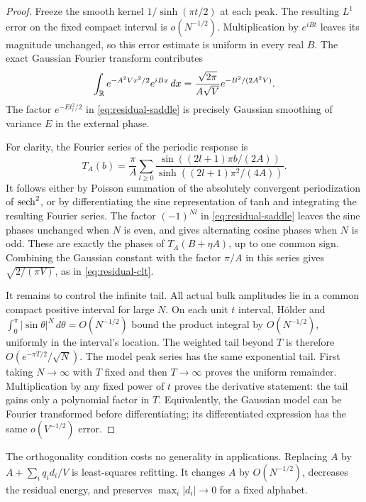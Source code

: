 \begin{proof}
Freeze the smooth kernel $1/\sinh(\pi t/2)$ at each peak. The resulting
$L^1$ error on the fixed compact interval is $o(N^{-1/2})$.
Multiplication by $e^{iBt}$ leaves its magnitude unchanged, so this
error estimate is uniform in every real $B$. The exact Gaussian Fourier
transform contributes
\[
 \int_{\mathbb R}e^{-A^2Vx^2/2}e^{iBx}\,dx
 =\frac{\sqrt{2\pi}}{A\sqrt V}e^{-B^2/(2A^2V)}.
\]
The factor $e^{-Et_l^2/2}$ in \eqref{eq:residual-saddle} is precisely
Gaussian smoothing of variance $E$ in the external phase.

For clarity, the Fourier series of the periodic response is
\[
 T_A(b)=\frac\pi A\sum_{l\ge0}
 \frac{\sin((2l+1)\pi b/(2A))}
      {\sinh((2l+1)\pi^2/(4A))}.
\]
It follows either by Poisson summation of the absolutely convergent
periodization of $\operatorname{sech}^2$, or by differentiating the sine representation
of tanh and integrating the resulting Fourier series. The factor
$(-1)^{Nl}$ in \eqref{eq:residual-saddle} leaves the sine phases unchanged
when $N$ is even, and gives alternating cosine phases when $N$ is odd.
These are exactly the phases of $T_A(B+\eta A)$, up to one common sign.
Combining the Gaussian constant with the factor $\pi/A$ in this series
gives $\sqrt{2/(\pi V)}$, as in \eqref{eq:residual-clt}.

It remains to control the infinite tail. All actual bulk amplitudes lie
in a common compact positive interval for large $N$. On each unit
$t$ interval, H\"older and
$\int_0^\pi|\sin\theta|^N\,d\theta=O(N^{-1/2})$ bound the product
integral by $O(N^{-1/2})$, uniformly in the interval's location.
The weighted tail beyond $T$ is therefore
$O(e^{-\pi T/2}/\sqrt N)$. The model peak series has the same
exponential tail. First taking $N\to\infty$ with $T$ fixed and then
$T\to\infty$ proves the uniform remainder. Multiplication by any fixed
power of $t$ proves the derivative statement: the tail gains only a
polynomial factor in $T$. Equivalently, the Gaussian model can be
Fourier transformed before differentiating; its differentiated
expression has the same $o(V^{-1/2})$ error.
\end{proof}

The orthogonality condition costs no generality in applications. Replacing
$A$ by $A+\sum_iq_id_i/V$ is least-squares refitting. It changes $A$ by
$O(N^{-1/2})$, decreases the residual energy, and preserves
$\max_i|d_i|\to0$ for a fixed alphabet.

